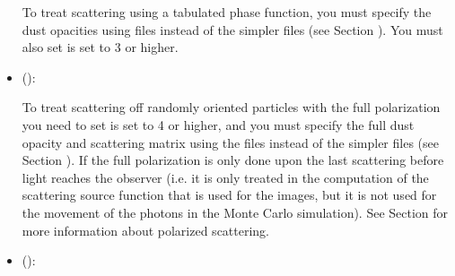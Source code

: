 \documentclass[letterpaper,10pt,english]{sphinxmanual}
\begin{document}
\begin{itemize}
To treat scattering using a tabulated phase function, you must specify the
dust opacities using  files instead of the simpler
 files (see Section {\hyperref[\detokenize{inputoutputfiles:sec-dustkapscatmat-files}]{}}). You
must also set  is set to 3 or higher.

\item {} 
 ():

To treat scattering off randomly oriented particles with the full polarization
you need to set  is set to 4 or higher, and you must
specify the full dust opacity and scattering matrix using the
 files instead of the simpler 
files (see Section {\hyperref[\detokenize{inputoutputfiles:sec-dustkapscatmat-files}]{}}). If 
the full polarization is only done upon the last scattering before light
reaches the observer (i.e. it is only treated in the computation of the
scattering source function that is used for the images, but it is not used for
the movement of the photons in the Monte Carlo simulation).  See Section
{\hyperref[\detokenize{dustradtrans:sec-polarized-scattering}]{}} for more information about polarized
scattering.

\item {} 
 ():


\end{itemize}
\end{document}
